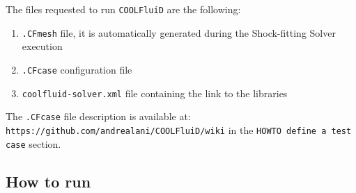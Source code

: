 \documentclass[11pt,a4paper,oneside]{article}
\begin{document}
The files requested to run \texttt{COOLFluiD} are the following:

\begin{enumerate}
\item{\texttt{.CFmesh} file, it is automatically generated during the Shock-fitting Solver execution}
\item{\texttt{.CFcase} configuration file}
\item{\texttt{coolfluid-solver.xml} file containing the link to the libraries}
\end{enumerate}
\noindent
The \texttt{.CFcase} file description is available at:
\newline
\newline
\hspace*{1cm}
\texttt{https://github.com/andrealani/COOLFluiD/wiki}
\newline
\newline
in the \texttt{HOWTO define a test case} section.

\subsection{How to run}
\label{subsec: run a test case}
\end{document}
